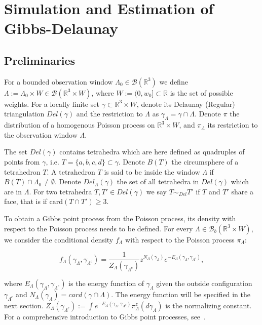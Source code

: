 \documentclass[12pt,a4paper]{report}
\begin{document}
\chapter{Simulation and Estimation of Gibbs-Delaunay}


\section{Preliminaries}
For a bounded observation window $\Lambda_0 \in\mathcal B(\mathbb R^3)$ we  define  $\Lambda := \Lambda_0 \times W \in \mathcal B(\mathbb R^3 \times W)$, where  $W:=(0,w_0]\subset \mathbb R$ is the set of possible weights. For a locally finite set $\gamma\subset \mathbb R^3\times W $, denote its Delaunay (Regular) triangulation $Del(\gamma)$ and the restriction to $\Lambda$ as  $\gamma_\Lambda = \gamma \cap \Lambda$. Denote $\pi$ the distribution of a homogenous Poisson process on $\mathbb R^3 \times W$, and $\pi_\Lambda$ its restriction to the observation window $\Lambda$. 

The set $Del(\gamma)$ contains tetrahedra which are here defined as quadruples of points from $\gamma$, i.e. $T=\{a,b,c,d\}\subset \gamma$. Denote $B(T)$ the circumsphere of a tetrahedron $T$. A tetrahedron $T$ is said to be inside the window $\Lambda$ if $B(T)\cap \Lambda_0 \neq \emptyset$. Denote $Del_\Lambda(\gamma)$ the set of all tetrahedra in $Del(\gamma)$ which are in $\Lambda$. For two tetrahedra $T,T'\in Del(\gamma)$ we say $T\sim_{Del} T'$ if $T$ and $T'$ share a face, that is if $\text{card}(T\cap T') \geq 3$. 

To obtain a Gibbs point process from the Poisson process, its density with respect to the Poisson process needs to be defined. For every $\Lambda \in \mathcal B_b(\mathbb R^3\times W)$, we consider the conditional density $f_\Lambda$ with respect to the Poisson process $\pi_\Lambda$:

$$ f_\Lambda(\gamma_\Lambda, \gamma_{\Lambda^c}) = \frac 1{Z_\Lambda(\gamma_{\Lambda^c})} z^{N_\Lambda(\gamma_\Lambda)} e^{-E_\Lambda (\gamma_\Lambda, \gamma_{\Lambda^c})},$$ 

where $E_\Lambda(\gamma_\Lambda, \gamma_{\Lambda^c})$ is the energy function of $\gamma_\Lambda$ given the outside configuration $\gamma_{\Lambda^c}$ and $N_\Lambda(\gamma_\Lambda) = card(\gamma \cap \Lambda)$. The energy function will be specified in the next section. $Z_\Lambda(\gamma_{\Lambda^c}) := \int e^{-E_\Lambda(\gamma_\Lambda, \gamma_{\Lambda^c})} \pi^z_\Lambda(d\gamma_\Lambda)$ is the normalizing constant.
For a comprehensive introduction to Gibbs point processes, see~\cite{dereudre2017}.
\end{document}
